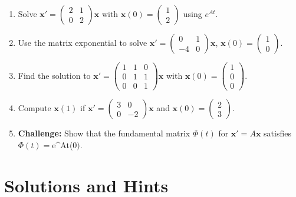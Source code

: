 \documentclass[12pt]{article}
\begin{document}
\begin{enumerate}[start=26]
\item Solve $\mathbf{x}' = \begin{pmatrix} 2 & 1 \\ 0 & 2 \end{pmatrix}\mathbf{x}$ with $\mathbf{x}(0) = \begin{pmatrix} 1 \\ 2 \end{pmatrix}$ using $e^{At}$.

\item Use the matrix exponential to solve $\mathbf{x}' = \begin{pmatrix} 0 & 1 \\ -4 & 0 \end{pmatrix}\mathbf{x}$, $\mathbf{x}(0) = \begin{pmatrix} 1 \\ 0 \end{pmatrix}$.

\item Find the solution to $\mathbf{x}' = \begin{pmatrix} 1 & 1 & 0 \\ 0 & 1 & 1 \\ 0 & 0 & 1 \end{pmatrix}\mathbf{x}$ with $\mathbf{x}(0) = \begin{pmatrix} 1 \\ 0 \\ 0 \end{pmatrix}$.

\item Compute $\mathbf{x}(1)$ if $\mathbf{x}' = \begin{pmatrix} 3 & 0 \\ 0 & -2 \end{pmatrix}\mathbf{x}$ and $\mathbf{x}(0) = \begin{pmatrix} 2 \\ 3 \end{pmatrix}$.

\item \textbf{Challenge:} Show that the fundamental matrix $\Phi(t)$ for $\mathbf{x}' = A\mathbf{x}$ satisfies $\Phi(t) = $e^{At}\Phi(0$)$.
\end{enumerate}

\section*{Solutions and Hints}
\end{document}
